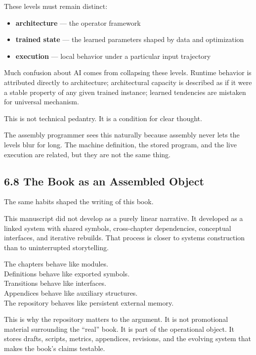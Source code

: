 These levels must remain distinct:

\begin{itemize}
\tightlist
\item
  \textbf{architecture} --- the operator framework
\item
  \textbf{trained state} --- the learned parameters shaped by data and
  optimization
\item
  \textbf{execution} --- local behavior under a particular input
  trajectory
\end{itemize}

Much confusion about AI comes from collapsing these levels. Runtime
behavior is attributed directly to architecture; architectural capacity
is described as if it were a stable property of any given trained
instance; learned tendencies are mistaken for universal mechanism.

This is not technical pedantry. It is a condition for clear thought.

The assembly programmer sees this naturally because assembly never lets
the levels blur for long. The machine definition, the stored program,
and the live execution are related, but they are not the same thing.

\hypertarget{the-book-as-an-assembled-object}{%
\subsection{6.8 The Book as an Assembled
Object}\label{the-book-as-an-assembled-object}}

The same habits shaped the writing of this book.

This manuscript did not develop as a purely linear narrative. It
developed as a linked system with shared symbols, cross-chapter
dependencies, conceptual interfaces, and iterative rebuilds. That
process is closer to systems construction than to uninterrupted
storytelling.

The chapters behave like modules.\\
Definitions behave like exported symbols.\\
Transitions behave like interfaces.\\
Appendices behave like auxiliary structures.\\
The repository behaves like persistent external memory.

This is why the repository matters to the argument. It is not
promotional material surrounding the ``real'' book. It is part of the
operational object. It stores drafts, scripts, metrics, appendices,
revisions, and the evolving system that makes the book's claims
testable.

